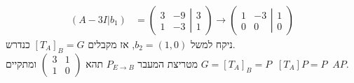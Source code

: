 \documentclass{article}
\DeclareMathOperator{\inv}{^{-1}}
\begin{document}
\begin{align*}
    (A-3I | b_1) & =
    \left(
    \begin{matrix}
        3 & -9 \\
        1 & -3
    \end{matrix}
    \left|
    \begin{matrix}
        3 \\
        1
    \end{matrix}
    \right.
    \right) \rightarrow
    \left(
    \begin{matrix}
        1 & -3 \\
        0 & 0
    \end{matrix}
    \left|
    \begin{matrix}
        1 \\
        0
    \end{matrix}
    \right.
    \right)
\end{align*}
ניקח למשל $b_2=(1,0)$, אז מקבלים $[T_A]_B=G$ כנדרש. \\
מטריצת המעבר $P_{E\rightarrow B}$ תהא $\begin{pmatrix}
        3 & 1 \\
        1 & 0
    \end{pmatrix}$ ומתקיים $G=[T_A]_B=P\inv [T_A]P=P\inv A P$.
\end{document}
